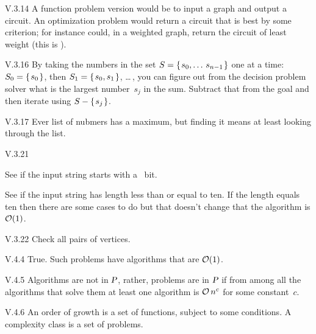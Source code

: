%
%
\begin{ans}{V.3.14}
A function problem version would be to input a graph and
output a circuit.
An optimization problem would return a circuit that is best by some
criterion; for instance could, in a weighted graph, return the circuit
of least weight (this is ).
\end{ans}
%
%
\begin{ans}{V.3.16}
By taking the numbers in the set $S=\set{s_0,\ldots\,s_{n-1}}$ one at a
time:~$S_0=\set{s_0}$, then $S_1=\set{s_0,s_1}$, \ldots\,,
you can figure out from the decision problem solver
what is the largest number~$s_j$ in the sum.
Subtract that from the goal and then iterate using $S-\set{s_j}$.
\end{ans}
%
\begin{ans}{V.3.17}
Ever list of nubmers has a maximum, but finding it means at least looking
through the list.
\end{ans}
%
%
%
%
\begin{ans}{V.3.21}
\begin{exparts}
\item See if the input string starts with a~ bit.
\item See if the input string has length less than or equal to ten.
If the length equals ten then there are some cases to do but that
doesn't change that the algorithm is $\bigOh(1)$.
\end{exparts}
\end{ans}
%
\begin{ans}{V.3.22}
Check all pairs of vertices.
\end{ans}
%
\begin{ans}{V.4.4}
True.
Such problems have algorithms that are $\bigOh(1)$.
\end{ans}
%
\begin{ans}{V.4.5}
Algorithms are not in $\P$, rather, problems are in $\P$ if from among all
the algorithms that solve them at least one algorithm is $\bigOh{n^c}$ for
some constant~$c$.
\end{ans}
%
\begin{ans}{V.4.6}
An order of growth is a set of functions, subject to some conditions.
A complexity class is a set of problems.
\end{ans}
